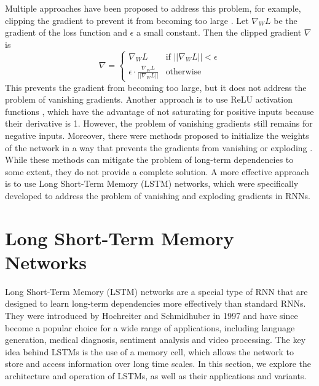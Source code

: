 \documentclass{article}
\begin{document}
Multiple approaches have been proposed to address this problem, for example, clipping the
gradient to prevent it from becoming too large
\cite{pascanuDifficultyTrainingRecurrent2013}. Let $\nabla_W L$ be the gradient of the
loss function and $\epsilon$ a small constant. Then the clipped gradient $\nabla$ is
\begin{equation}
  \nabla =
  \begin{cases}
    \nabla_W L                                       & \text{if } ||\nabla_W L|| < \epsilon \\
    \epsilon \cdot \frac{\nabla_W L}{||\nabla_W L||} & \text{otherwise}
  \end{cases}
\end{equation}
This prevents the gradient from becoming too large, but it does not address the problem of
vanishing gradients. Another approach is to use ReLU activation functions
\cite{glorotDeepSparseRectifier2010}, which have the advantage of not saturating for
positive inputs because their derivative is 1. However, the problem of vanishing gradients
still remains for negative inputs. Moreover, there were methods proposed to initialize the
weights of the network in a way that prevents the gradients from vanishing or exploding
\cite{kumar2017weight}. While these methods can mitigate the problem of long-term
dependencies to some extent, they do not provide a complete solution. A more effective
approach is to use Long Short-Term Memory (LSTM) networks, which were specifically
developed to address the problem of vanishing and exploding gradients in RNNs.



\section{Long Short-Term Memory Networks}
\label{ch:3}

Long Short-Term Memory (LSTM) networks are a special type of RNN that are designed to
learn long-term dependencies more effectively than standard RNNs. They were introduced by
Hochreiter and Schmidhuber in 1997 \cite{hochreiterLongShorttermMemory1997} and have since
become a popular choice for a wide range of applications, including language generation,
medical diagnosis, sentiment analysis and video processing. The key idea behind LSTMs is
the use of a memory cell, which allows the network to store and access information over
long time scales. In this section, we explore the architecture and operation of LSTMs, as
well as their applications and variants.
\end{document}
